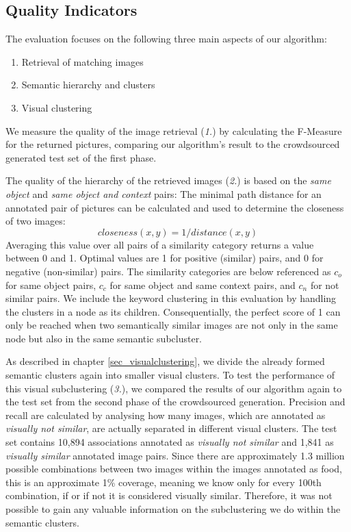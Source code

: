 \subsection{Quality Indicators}
\label{sec_qualityindicators}
The evaluation focuses on the following three main aspects of our algorithm:
\begin{enumerate}
\item Retrieval of matching images
\item Semantic hierarchy and clusters
\item Visual clustering
\end{enumerate}

We measure the quality of the image retrieval (\emph{1.}) by calculating the F-Measure for the returned pictures, comparing our algorithm's result to the crowdsourced generated test set of the first phase.

The quality of the hierarchy of the retrieved images (\emph{2.}) is based on the \emph{same object} and \emph{same object and context} pairs: The  minimal path distance for an annotated pair of pictures can be calculated and used to determine the closeness of two images: \[closeness(x,y) = 1/distance(x,y)\]
Averaging this value over all pairs of a similarity category returns a value between 0 and 1. Optimal values are 1 for positive (similar) pairs, and 0 for negative (non-similar) pairs. The similarity categories are below referenced as $c_o$ for same object pairs, $c_c$ for same object and same context pairs, and $c_n$ for not similar pairs.
We include the keyword clustering in this evaluation by handling the clusters in a node as its children. Consequentially, the perfect score of 1 can only be reached when two semantically similar images are not only in the same node but also in the same semantic subcluster.

\bigskip
As described in chapter \ref{sec_visualclustering}, we divide the already formed semantic clusters again into smaller visual clusters.
To test the performance of this visual subclustering (\emph{3.}), we compared the results of our algorithm again to the test set from the second phase of the crowdsourced generation.
Precision and recall are calculated by analysing how many images, which are annotated as \emph{visually not similar}, are actually separated in different visual clusters.
The test set contains 10,894 associations annotated as \emph{visually not similar} and 1,841 as \emph{visually similar} annotated image pairs.
Since there are approximately 1.3 million possible combinations between two images within the images annotated as food, this is an approximate 1\% coverage, meaning we know only for every 100th combination, if or if not it is considered visually similar.
Therefore, it was not possible to gain any valuable information on the subclustering we do within the semantic clusters.


